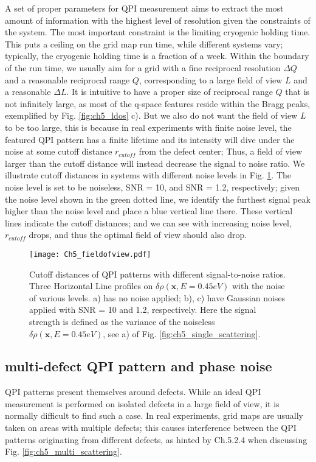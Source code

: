 A set of proper parameters for \ac{QPI} measurement aims to extract the most amount of information with the highest level of resolution given the constraints of the system. The most important constraint is the limiting cryogenic holding time. This puts a ceiling on the grid map run time, while different systems vary; typically, the cryogenic holding time is a fraction of a week. Within the boundary of the run time, we usually aim for a grid with a fine reciprocal resolution $\Delta Q$ and a reasonable reciprocal range $Q$, corresponding to a large field of view $L$ and a reasonable $\Delta L$. It is intuitive to have a proper size of reciprocal range $Q$ that is not infinitely large, as most of the q-space features reside within the Bragg peaks, exemplified by Fig. \ref{fig:ch5_ldos} c). But we also do not want the field of view $L$ to be too large, this is because in real experiments with finite noise level, the featured \ac{QPI} pattern has a finite lifetime and its intensity will dive under the noise at some cutoff distance $r_{cutoff}$ from the defect center; Thus, a field of view larger than the cutoff distance will instead decrease the signal to noise ratio. We illustrate cutoff distances in systems with different noise levels in Fig. \ref{fig:ch5_cutoff}. The noise level is set to be noiseless, SNR = 10, and SNR = 1.2, respectively; given the noise level shown in the green dotted line, we identify the furthest signal peak higher than the noise level and place a blue vertical line there. These vertical lines indicate the cutoff distances; and we can see with increasing noise level, $r_{cutoff}$ drops, and thus the optimal field of view should also drop.  

\begin{figure}
	\texttt{[image: Ch5\_fieldofview.pdf]} 
	\centering
	\caption{Cutoff distances of QPI patterns with different signal-to-noise ratios. Three Horizontal Line profiles on $\delta\rho(\textbf{x}, E=0.45eV)$ with the noise of various levels. a) has no noise applied; b), c) have Gaussian noises applied with SNR = 10 and 1.2, respectively. Here the signal strength is defined as the variance of the noiseless $\delta\rho(\textbf{x}, E=0.45eV)$, see a) of Fig. \ref{fig:ch5_single_scattering}.}
	\label{fig:ch5_cutoff}
\end{figure}


\subsection{multi-defect QPI pattern and phase noise}
\ac{QPI} patterns present themselves around defects. While an ideal \ac{QPI} measurement is performed on isolated defects in a large field of view, it is normally difficult to find such a case. In real experiments, grid maps are usually taken on areas with multiple defects; this causes interference between the \ac{QPI} patterns originating from different defects, as hinted by Ch.5.2.4 when discussing Fig. \ref{fig:ch5_multi_scattering}.

